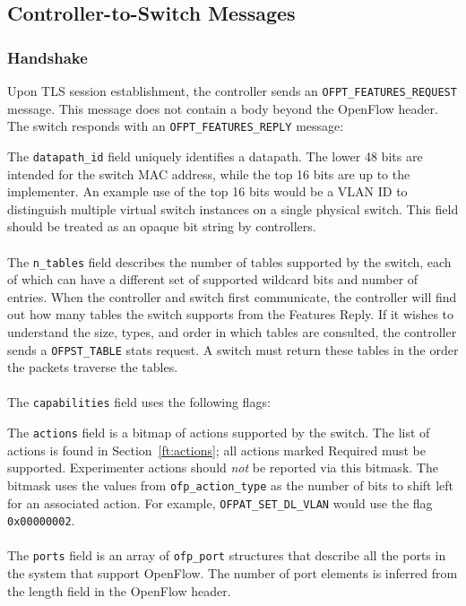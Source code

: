 \subsection{Controller-to-Switch Messages}

\subsubsection{Handshake}
\label{cts:handshake} 
Upon TLS session establishment, the controller sends an \verb|OFPT_FEATURES_REQUEST| message.  This message does not contain a body beyond the OpenFlow header.  The switch responds with an \verb|OFPT_FEATURES_REPLY| message:


The \verb|datapath_id| field uniquely identifies a datapath.  The lower 48 bits are intended for the switch MAC address, while the top 16 bits are up to the implementer.  An example use of the top 16 bits would be a VLAN ID to distinguish multiple virtual switch instances on a single physical switch.  This field should be treated as an opaque bit string by controllers.
\\\\
The \verb|n_tables| field describes the number of tables supported by the switch, each of which can have a different set of supported wildcard bits and number of entries.  When the controller and switch first communicate, the controller will find out how many tables the switch supports from the Features Reply. If it wishes to understand the size, types, and order in which tables are consulted, the controller sends a \verb|OFPST_TABLE| stats request. A switch must return these tables in the order the packets traverse the tables.
\\\\
The \verb|capabilities| field uses the following flags:

 
The \verb|actions| field is a bitmap of actions supported by the switch.  The list of actions is found in Section~\ref{ft:actions}; all actions marked Required must be supported. Experimenter actions should \emph{not} be reported via this bitmask. The bitmask uses the values from \verb|ofp_action_type| as the number of bits to shift left for an associated action. For example, \verb|OFPAT_SET_DL_VLAN| would use the flag \verb|0x00000002|.
\\\\
The \verb|ports| field is an array of \verb|ofp_port| structures that describe all the ports in the system that support OpenFlow.  The number of port elements is inferred from the length field in the OpenFlow header. 

